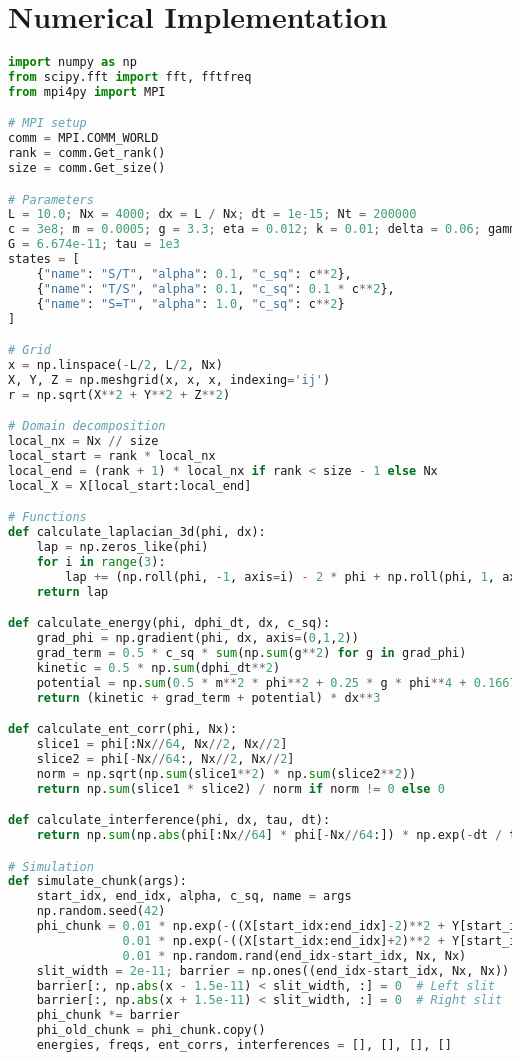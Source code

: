 \documentclass{article}
\begin{document}
\section{Numerical Implementation}
\begin{lstlisting}[language=Python, caption=Ehokolon Double-Slit Simulation, label=lst:doubleslit]
import numpy as np
from scipy.fft import fft, fftfreq
from mpi4py import MPI

# MPI setup
comm = MPI.COMM_WORLD
rank = comm.Get_rank()
size = comm.Get_size()

# Parameters
L = 10.0; Nx = 4000; dx = L / Nx; dt = 1e-15; Nt = 200000
c = 3e8; m = 0.0005; g = 3.3; eta = 0.012; k = 0.01; delta = 0.06; gamma = 0.0225
G = 6.674e-11; tau = 1e3
states = [
    {"name": "S/T", "alpha": 0.1, "c_sq": c**2},
    {"name": "T/S", "alpha": 0.1, "c_sq": 0.1 * c**2},
    {"name": "S=T", "alpha": 1.0, "c_sq": c**2}
]

# Grid
x = np.linspace(-L/2, L/2, Nx)
X, Y, Z = np.meshgrid(x, x, x, indexing='ij')
r = np.sqrt(X**2 + Y**2 + Z**2)

# Domain decomposition
local_nx = Nx // size
local_start = rank * local_nx
local_end = (rank + 1) * local_nx if rank < size - 1 else Nx
local_X = X[local_start:local_end]

# Functions
def calculate_laplacian_3d(phi, dx):
    lap = np.zeros_like(phi)
    for i in range(3):
        lap += (np.roll(phi, -1, axis=i) - 2 * phi + np.roll(phi, 1, axis=i)) / dx**2
    return lap

def calculate_energy(phi, dphi_dt, dx, c_sq):
    grad_phi = np.gradient(phi, dx, axis=(0,1,2))
    grad_term = 0.5 * c_sq * sum(np.sum(g**2) for g in grad_phi)
    kinetic = 0.5 * np.sum(dphi_dt**2)
    potential = np.sum(0.5 * m**2 * phi**2 + 0.25 * g * phi**4 + 0.1667 * eta * phi**6)
    return (kinetic + grad_term + potential) * dx**3

def calculate_ent_corr(phi, Nx):
    slice1 = phi[:Nx//64, Nx//2, Nx//2]
    slice2 = phi[-Nx//64:, Nx//2, Nx//2]
    norm = np.sqrt(np.sum(slice1**2) * np.sum(slice2**2))
    return np.sum(slice1 * slice2) / norm if norm != 0 else 0

def calculate_interference(phi, dx, tau, dt):
    return np.sum(np.abs(phi[:Nx//64] * phi[-Nx//64:]) * np.exp(-dt / tau)) * dx**3

# Simulation
def simulate_chunk(args):
    start_idx, end_idx, alpha, c_sq, name = args
    np.random.seed(42)
    phi_chunk = 0.01 * np.exp(-((X[start_idx:end_idx]-2)**2 + Y[start_idx:end_idx]**2 + Z[start_idx:end_idx]**2)/0.1**2) * np.cos(5*X[start_idx:end_idx]) + \
                0.01 * np.exp(-((X[start_idx:end_idx]+2)**2 + Y[start_idx:end_idx]**2 + Z[start_idx:end_idx]**2)/0.1**2) * np.cos(5*X[start_idx:end_idx]) + \
                0.01 * np.random.rand(end_idx-start_idx, Nx, Nx)
    slit_width = 2e-11; barrier = np.ones((end_idx-start_idx, Nx, Nx))
    barrier[:, np.abs(x - 1.5e-11) < slit_width, :] = 0  # Left slit
    barrier[:, np.abs(x + 1.5e-11) < slit_width, :] = 0  # Right slit
    phi_chunk *= barrier
    phi_old_chunk = phi_chunk.copy()
    energies, freqs, ent_corrs, interferences = [], [], [], []
    

\end{lstlisting}
\end{document}
